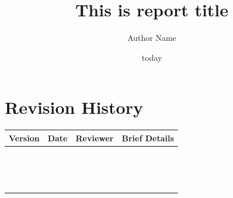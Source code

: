 \documentclass[12pt,a4paper]{report}
\begin{document}

\title{This is report title}
\author{Author Name}
\date{today}
\maketitle

\renewcommand*\thesection{\Large{\arabic{section}}}
\section*{Revision History}
	\begin{table}[h!]
		\centering
		\begin{longtable}{|c|c|c|p{7cm}|} \hline
			\textbf{Version} & \textbf{Date} & \textbf{Reviewer} & \textbf{Brief Details} \\\hline
			\endhead
			\endfoot
			\endlastfoot
			& & & \\\hline
			& & & \\\hline
			& & & \\\hline
			& & & \\\hline
			& & & \\\hline
			& & & \\\hline
			& & & \\\hline
			& & & \\\hline
			& & & \\\hline
			& & & \\\hline
			& & & \\\hline
			& & & \\\hline
			& & & \\\hline
			& & & \\\hline
			& & & \\\hline
		\end{longtable}
	\end{table}
\pagebreak
\end{document}
